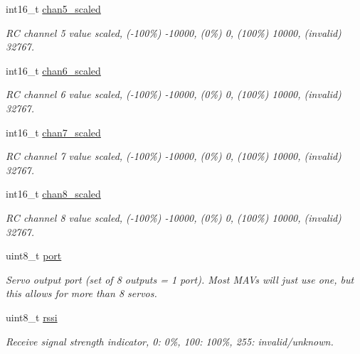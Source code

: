 \begin{DoxyCompactItemize}
int16\+\_\+t \hyperlink{struct____mavlink__rc__channels__scaled__t_a746191bf8db147d0271f755814e62c5d}{chan5\+\_\+scaled}
\begin{DoxyCompactList}\small\item\em R\+C channel 5 value scaled, (-\/100\%) -\/10000, (0\%) 0, (100\%) 10000, (invalid) 32767. \end{DoxyCompactList}\item 
int16\+\_\+t \hyperlink{struct____mavlink__rc__channels__scaled__t_a0554cbaeb193f0243986c02c6396b159}{chan6\+\_\+scaled}
\begin{DoxyCompactList}\small\item\em R\+C channel 6 value scaled, (-\/100\%) -\/10000, (0\%) 0, (100\%) 10000, (invalid) 32767. \end{DoxyCompactList}\item 
int16\+\_\+t \hyperlink{struct____mavlink__rc__channels__scaled__t_a1e3c67b2bff9476d2c2da3e757993a1b}{chan7\+\_\+scaled}
\begin{DoxyCompactList}\small\item\em R\+C channel 7 value scaled, (-\/100\%) -\/10000, (0\%) 0, (100\%) 10000, (invalid) 32767. \end{DoxyCompactList}\item 
int16\+\_\+t \hyperlink{struct____mavlink__rc__channels__scaled__t_a53c6f6016f7f9e8a93ed1b1b959e1de7}{chan8\+\_\+scaled}
\begin{DoxyCompactList}\small\item\em R\+C channel 8 value scaled, (-\/100\%) -\/10000, (0\%) 0, (100\%) 10000, (invalid) 32767. \end{DoxyCompactList}\item 
\hypertarget{struct____mavlink__rc__channels__scaled__t_a8781afa3337e7a7e4b88b66569dcdf5a}{uint8\+\_\+t \hyperlink{struct____mavlink__rc__channels__scaled__t_a8781afa3337e7a7e4b88b66569dcdf5a}{port}}\label{struct____mavlink__rc__channels__scaled__t_a8781afa3337e7a7e4b88b66569dcdf5a}

\begin{DoxyCompactList}\small\item\em Servo output port (set of 8 outputs = 1 port). Most M\+A\+Vs will just use one, but this allows for more than 8 servos. \end{DoxyCompactList}\item 
\hypertarget{struct____mavlink__rc__channels__scaled__t_a06ada0758b5f85258d48fd19ebe7a5bd}{uint8\+\_\+t \hyperlink{struct____mavlink__rc__channels__scaled__t_a06ada0758b5f85258d48fd19ebe7a5bd}{rssi}}\label{struct____mavlink__rc__channels__scaled__t_a06ada0758b5f85258d48fd19ebe7a5bd}

\begin{DoxyCompactList}\small\item\em Receive signal strength indicator, 0\+: 0\%, 100\+: 100\%, 255\+: invalid/unknown. \end{DoxyCompactList}\end{DoxyCompactItemize}


